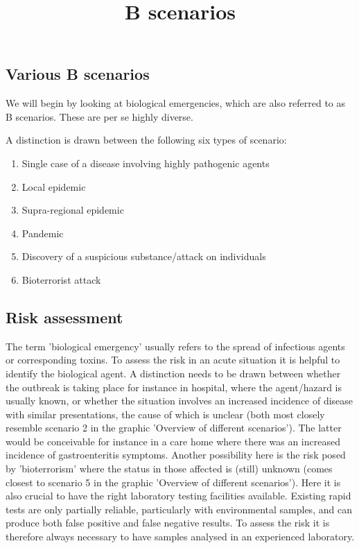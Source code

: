 \documentclass{article}
\begin{document}
\title{B scenarios}

\maketitle


\subsection{Various B scenarios}\label{H9415283}



We will begin by looking at biological emergencies, which are also referred to as B scenarios. These are per se highly diverse.


A distinction is drawn between the following six types of scenario:

\begin{enumerate}
\item Single case of a disease involving highly pathogenic agents


\item Local epidemic


\item Supra-regional epidemic


\item Pandemic


\item Discovery of a suspicious substance/attack on individuals


\item Bioterrorist attack


\end{enumerate}

\subsection{Risk assessment}\label{H7128019}



The term 'biological emergency' usually refers to the spread of infectious agents or corresponding toxins. To assess the risk in an acute situation it is helpful to identify the biological agent. A distinction needs to be drawn between whether the outbreak is taking place for instance in hospital, where the agent/hazard is usually known, or whether the situation involves an increased incidence of disease with similar presentations, the cause of which is unclear (both most closely resemble scenario 2 in the graphic 'Overview of different scenarios'). The latter would be conceivable for instance in a care home where there was an increased incidence of gastroenteritis symptoms. Another possibility here is the risk posed by 'bioterrorism' where the status in those affected is (still) unknown (comes closest to scenario 5 in the graphic 'Overview of different scenarios'). Here it is also crucial to have the right laboratory testing facilities available. Existing rapid tests are only partially reliable, particularly with environmental samples, and can produce both false positive and false negative results. To assess the risk it is therefore always necessary to have samples analysed in an experienced laboratory.
\end{document}
